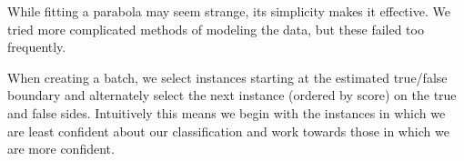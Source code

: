 \documentclass[ms,electronic,twosidetoc,letterpaper,chaptercenter,parttop,lof,lot]{byumsphd}
\begin{document}
While fitting a parabola may seem strange, its simplicity makes it effective. We tried more complicated methods of modeling the data, but these failed too frequently.

When creating a batch, we select instances starting at the estimated true/false boundary and alternately select the next instance (ordered by score) on the true and false sides. Intuitively this means we begin with the instances in which we are least confident about our classification and work towards those in which we are more confident.


\end{document}
